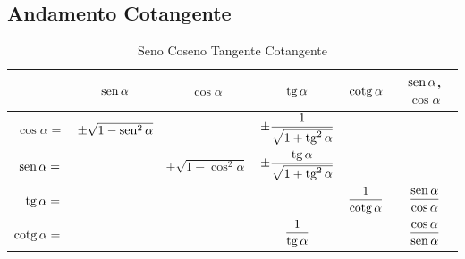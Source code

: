 \subsection{Andamento Cotangente}
\label{sec:AndamentoCotangente}
\begin{table}[tbp]
	\centering
	\renewcommand{\arraystretch}{2}
	\begin{tabular}{rccccc}
	\toprule
	& $\operatorname{sen}\alpha$ &$\cos\alpha$&$\operatorname{tg}\alpha$ &$\operatorname{cotg}\alpha$ & $\operatorname{sen}\alpha$, $\cos\alpha$ \\[.6cm]
	\midrule
	$\cos\alpha={}$& $\pm\sqrt{1-\operatorname{sen}^2\alpha}$ & &$\pm\dfrac{1}{\sqrt{1+\operatorname{tg}^2\alpha}}$ & & \\ [.6cm]
	$\operatorname{sen}\alpha={}$& & $\pm\sqrt{1-\cos^2\alpha}$ &$\pm\dfrac{\operatorname{tg}\alpha}{\sqrt{1+\operatorname{tg}^2\alpha}}$ & & \\ [.6cm]
	$\operatorname{tg}\alpha={}$& & & & $\dfrac{1}{\operatorname{cotg}\alpha}$ &$\dfrac{\operatorname{sen}\alpha}{\cos\alpha}$\\ [.6cm]
	$\operatorname{cotg}\alpha={}$& & &$\dfrac{1}{\operatorname{tg}\alpha}$ & &$\dfrac{\cos\alpha}{\operatorname{sen}\alpha}$\\[.6cm] 
	\bottomrule
	\end{tabular}
	\caption{Seno Coseno Tangente Cotangente}
	\label{tab:SenoCosenoTangenteCotangente}
\end{table}
\renewcommand{\arraystretch}{1}
